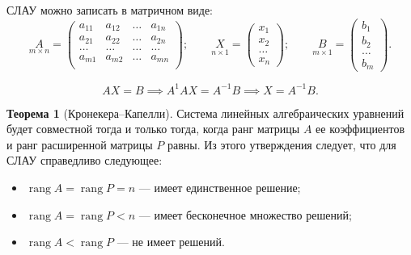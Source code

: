 \documentclass[a5paper, 11pt]{extbook}
\theoremstyle{definition}
\newtheorem{theorem}{Теорема}[chapter]
\theoremstyle{definition}
\DeclareMathOperator{\rang}{rang}
\begin{document}
СЛАУ можно записать в матричном виде:
\begin{equation*}
    \underset{m \times n}{A} =
    \begin{pmatrix}
        a_{11} & a_{12} & \ldots & a_{1n} \\
        a_{21} & a_{22} & \ldots & a_{2n} \\
        \ldots & \ldots & \ldots & \ldots \\
        a_{m1} & a_{m2} & \ldots & a_{mn} \\
    \end{pmatrix};
    \qquad
    \underset{n \times 1}{X} =
    \begin{pmatrix}
        x_1    \\
        x_2    \\
        \ldots \\
        x_n
    \end{pmatrix};
    \qquad
    \underset{m \times 1}{B} =
    \begin{pmatrix}
        b_1    \\
        b_2    \\
        \ldots \\
        b_m
    \end{pmatrix}.
\end{equation*}

\begin{equation*}
    AX = B
    \implies
    A^{1} A X = A^{-1} B
    \implies
    X = A^{-1} B.
\end{equation*}

\begin{theorem}[Кронекера–Капелли]
    Система линейных алгебраических уравнений будет совместной тогда и только тогда, когда ранг матрицы \(A\) ее коэффициентов и ранг расширенной матрицы \(P\) равны. Из этого утверждения следует, что для СЛАУ справедливо следующее:
    \begin{itemize}
        \item \(\rang A = \rang P = n\) — имеет единственное решение;
        \item \(\rang A = \rang P < n\) — имеет бесконечное множество решений;
        \item \(\rang A < \rang P\) — не имеет решений.
    \end{itemize}
\end{theorem}
\end{document}
